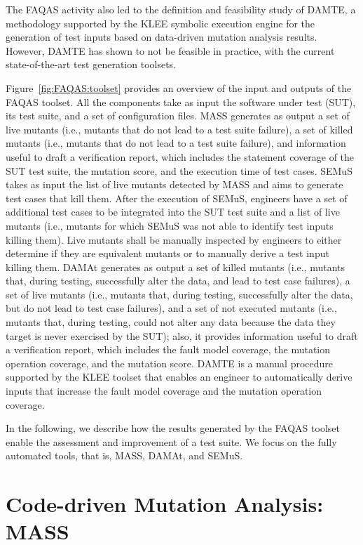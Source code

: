 The FAQAS activity also led to the definition and feasibility study of DAMTE, a methodology supported by the KLEE symbolic execution engine for the generation of test inputs based on data-driven mutation analysis results. However, DAMTE has shown to not be feasible in practice, with the current state-of-the-art test generation toolsets.

Figure~\ref{fig:FAQAS:toolset} provides an overview of the input and outputs of the FAQAS toolset. All the components take as input the software under test (SUT), its test suite, and a set of configuration files.
MASS generates as output a set of live mutants (i.e., mutants that do not lead to a test suite failure), a set of killed mutants (i.e., mutants that do not lead to a test suite failure), and information useful to draft a verification report, which includes the statement coverage of the SUT test suite, the mutation score, and the execution time of test cases.
SEMuS takes as input the list of live mutants detected by MASS and aims to generate test cases that kill them. After the
 execution of SEMuS, engineers have a set of additional test cases to be integrated into the SUT test suite and a list of live mutants (i.e., mutants for which SEMuS was not able to identify test inputs killing them). Live mutants shall be manually inspected by engineers to either determine if they are equivalent mutants or to manually derive a test input killing them.
 DAMAt generates as output a set of killed mutants (i.e., mutants that, during testing, successfully alter the data, and lead to test case failures), a set of live mutants (i.e., mutants that, during testing, successfully alter the data, but do not lead to test case failures), and a set of not executed mutants (i.e., mutants that, during testing, could not alter any data because the data they target is never exercised by the SUT); also, it provides information useful to draft a verification report, which includes the fault model coverage, the mutation operation coverage, and the mutation score.
 DAMTE is a manual procedure supported by the KLEE toolset that enables an engineer to automatically derive inputs that increase the fault model coverage and the mutation operation coverage.

In the following, we describe how the results generated by the FAQAS toolset enable the assessment and improvement of a test suite.
We focus on the fully automated tools, that is, MASS, DAMAt, and SEMuS.


\section{Code-driven Mutation Analysis: MASS}
\label{sec:meth:mass}

